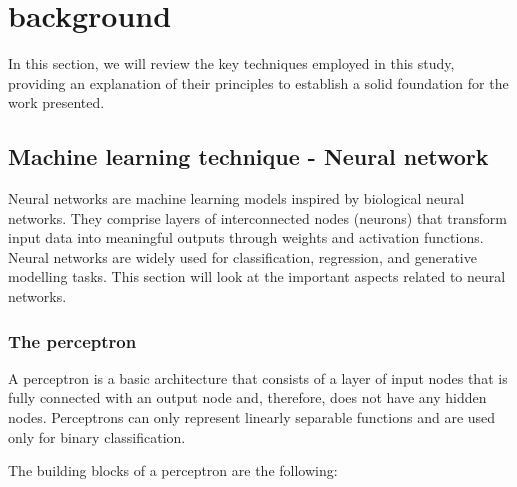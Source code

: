 \section{background}


	In this section, we will review the key techniques employed in this study, providing an explanation of their principles to establish a solid foundation for the work presented.






	
	
	\subsection{Machine learning technique - Neural network}

		
		Neural networks are machine learning models inspired by biological neural networks. They comprise layers of interconnected nodes (neurons) that transform input data into meaningful outputs through weights and activation functions. Neural networks are widely used for classification, regression, and generative modelling tasks. This section will look at the important aspects related to neural networks.
		
		
		\bigskip
		\subsubsection{The perceptron}
				
		A perceptron is a basic architecture that consists of a layer of input nodes that is fully connected with an output node and, therefore, does not have any hidden nodes. Perceptrons can only represent linearly separable functions and are used only for binary classification.
		
		The building blocks of a perceptron are the following:
		

